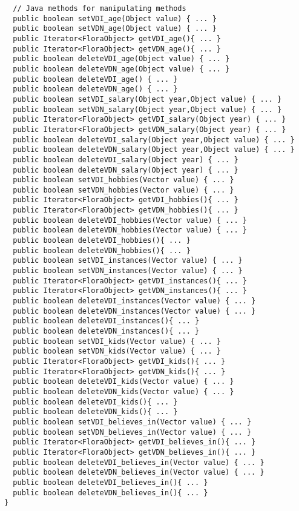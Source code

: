 \begin{verbatim}
  // Java methods for manipulating methods
  public boolean setVDI_age(Object value) { ... }
  public boolean setVDN_age(Object value) { ... }
  public Iterator<FloraObject> getVDI_age(){ ... }
  public Iterator<FloraObject> getVDN_age(){ ... }
  public boolean deleteVDI_age(Object value) { ... }
  public boolean deleteVDN_age(Object value) { ... }
  public boolean deleteVDI_age() { ... }
  public boolean deleteVDN_age() { ... }
  public boolean setVDI_salary(Object year,Object value) { ... }
  public boolean setVDN_salary(Object year,Object value) { ... }
  public Iterator<FloraObject> getVDI_salary(Object year) { ... }
  public Iterator<FloraObject> getVDN_salary(Object year) { ... }
  public boolean deleteVDI_salary(Object year,Object value) { ... }
  public boolean deleteVDN_salary(Object year,Object value) { ... }
  public boolean deleteVDI_salary(Object year) { ... }
  public boolean deleteVDN_salary(Object year) { ... }
  public boolean setVDI_hobbies(Vector value) { ... }
  public boolean setVDN_hobbies(Vector value) { ... }
  public Iterator<FloraObject> getVDI_hobbies(){ ... }
  public Iterator<FloraObject> getVDN_hobbies(){ ... }
  public boolean deleteVDI_hobbies(Vector value) { ... }
  public boolean deleteVDN_hobbies(Vector value) { ... }
  public boolean deleteVDI_hobbies(){ ... }
  public boolean deleteVDN_hobbies(){ ... }
  public boolean setVDI_instances(Vector value) { ... }
  public boolean setVDN_instances(Vector value) { ... }
  public Iterator<FloraObject> getVDI_instances(){ ... }
  public Iterator<FloraObject> getVDN_instances(){ ... }
  public boolean deleteVDI_instances(Vector value) { ... }
  public boolean deleteVDN_instances(Vector value) { ... }
  public boolean deleteVDI_instances(){ ... }
  public boolean deleteVDN_instances(){ ... }
  public boolean setVDI_kids(Vector value) { ... }
  public boolean setVDN_kids(Vector value) { ... }
  public Iterator<FloraObject> getVDI_kids(){ ... }
  public Iterator<FloraObject> getVDN_kids(){ ... }
  public boolean deleteVDI_kids(Vector value) { ... }
  public boolean deleteVDN_kids(Vector value) { ... }
  public boolean deleteVDI_kids(){ ... }
  public boolean deleteVDN_kids(){ ... }
  public boolean setVDI_believes_in(Vector value) { ... }
  public boolean setVDN_believes_in(Vector value) { ... }
  public Iterator<FloraObject> getVDI_believes_in(){ ... }
  public Iterator<FloraObject> getVDN_believes_in(){ ... }
  public boolean deleteVDI_believes_in(Vector value) { ... }
  public boolean deleteVDN_believes_in(Vector value) { ... }
  public boolean deleteVDI_believes_in(){ ... }
  public boolean deleteVDN_believes_in(){ ... }
}
\end{verbatim}

